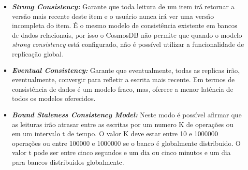 \documentclass[12pt]{article}
\begin{document}
\begin{itemize}
	\item \textbf{\textit{Strong Consistency:}} Garante que toda leitura de um item irá retornar a versão mais recente deste item e o usuário nunca irá ver uma versão incompleta do item. 
	É o mesmo modelo de consistência existente em bancos de dados relacionais, por isso o CosmosDB não permite que quando o modelo \textit{strong consistency} está configurado, não é possível utilizar a funcionalidade
	de replicação global.
	\item \textbf{\textit{Eventual Consistency:}} Garante que eventualmente, todas as replicas irão, eventualmente, convergir para refletir a escrita mais recente. Em termos de consistência de dados é um modelo fraco, mas,
	oferece a menor latência de todos os modelos oferecidos. 
	\item \textbf{\textit{Bound Staleness Consistency Model:}} Neste modo é possível afirmar que as leituras irão atrasar entre as escritas por um numero K de operações ou em um intervalo t de tempo. O valor K deve estar entre
	10 e 1000000 operações ou entre 100000 e 1000000 se o banco é globalmente distribuido. O valor t pode ser entre cinco segundos e um dia ou cinco minutos e um dia para bancos distribuidos globalmente.
\end{itemize}


\end{document}
